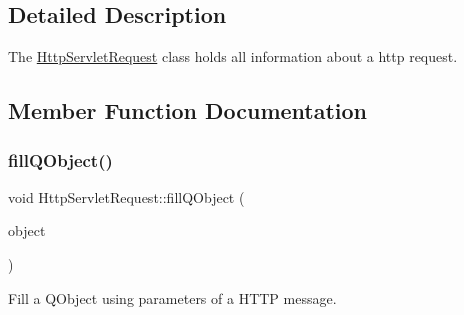 \subsection{Detailed Description}
The \hyperlink{class_http_servlet_request}{Http\+Servlet\+Request} class holds all information about a http request. 

\subsection{Member Function Documentation}
\mbox{\label{class_http_servlet_request_a5bed980c9d5d04cecee50ac6fe011a90}} 
\subsubsection{\texorpdfstring{fill\+Q\+Object()}{fillQObject()}}
{\footnotesize\ttfamily void Http\+Servlet\+Request\+::fill\+Q\+Object (\begin{DoxyParamCaption}\item[{Q\+Object $\ast$}]{object }\end{DoxyParamCaption})}



Fill a Q\+Object using parameters of a H\+T\+TP message. 


